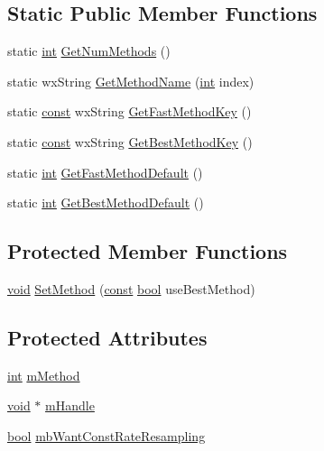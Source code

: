 \subsection*{Static Public Member Functions}
\begin{DoxyCompactItemize}
\item 
static \hyperlink{xmltok_8h_a5a0d4a5641ce434f1d23533f2b2e6653}{int} \hyperlink{class_resample_a4b0e88cf169adfface4372add19f33bf}{Get\+Num\+Methods} ()
\item 
static wx\+String \hyperlink{class_resample_ae5ce14d73c40356d62f7cf7ef7a4f303}{Get\+Method\+Name} (\hyperlink{xmltok_8h_a5a0d4a5641ce434f1d23533f2b2e6653}{int} index)
\item 
static \hyperlink{getopt1_8c_a2c212835823e3c54a8ab6d95c652660e}{const} wx\+String \hyperlink{class_resample_a1e0d0cd90f47e44f5488bbef2815abbf}{Get\+Fast\+Method\+Key} ()
\item 
static \hyperlink{getopt1_8c_a2c212835823e3c54a8ab6d95c652660e}{const} wx\+String \hyperlink{class_resample_ae4704691e79b2eea655f8dbd55a2897c}{Get\+Best\+Method\+Key} ()
\item 
static \hyperlink{xmltok_8h_a5a0d4a5641ce434f1d23533f2b2e6653}{int} \hyperlink{class_resample_a74401f8d29ab2bdd19d0dc41e033afb3}{Get\+Fast\+Method\+Default} ()
\item 
static \hyperlink{xmltok_8h_a5a0d4a5641ce434f1d23533f2b2e6653}{int} \hyperlink{class_resample_a00263b6442721adaacf0c7598c00909d}{Get\+Best\+Method\+Default} ()
\end{DoxyCompactItemize}
\subsection*{Protected Member Functions}
\begin{DoxyCompactItemize}
\item 
\hyperlink{sound_8c_ae35f5844602719cf66324f4de2a658b3}{void} \hyperlink{class_resample_a46121eb22d15f4faf9872caccfc4c4d8}{Set\+Method} (\hyperlink{getopt1_8c_a2c212835823e3c54a8ab6d95c652660e}{const} \hyperlink{mac_2config_2i386_2lib-src_2libsoxr_2soxr-config_8h_abb452686968e48b67397da5f97445f5b}{bool} use\+Best\+Method)
\end{DoxyCompactItemize}
\subsection*{Protected Attributes}
\begin{DoxyCompactItemize}
\item 
\hyperlink{xmltok_8h_a5a0d4a5641ce434f1d23533f2b2e6653}{int} \hyperlink{class_resample_aaa211164c846c3fb4821b58f752289e0}{m\+Method}
\item 
\hyperlink{sound_8c_ae35f5844602719cf66324f4de2a658b3}{void} $\ast$ \hyperlink{class_resample_ae81fd13c80c1a50c4b1f2564a40c50cf}{m\+Handle}
\item 
\hyperlink{mac_2config_2i386_2lib-src_2libsoxr_2soxr-config_8h_abb452686968e48b67397da5f97445f5b}{bool} \hyperlink{class_resample_a1a66a9297181cbb32c0756b1b2c82fd1}{mb\+Want\+Const\+Rate\+Resampling}
\end{DoxyCompactItemize}


